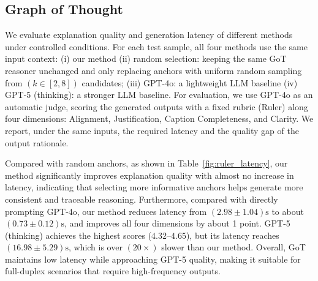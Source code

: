 \subsection{Graph of Thought}
We evaluate explanation quality and generation latency of different methods under controlled conditions. For each test sample, all four methods use the same input context: (i) our method (ii) random selection: keeping the same GoT reasoner unchanged and only replacing anchors with uniform random sampling from $(k\in[2,8])$ candidates; (iii) GPT-4o: a lightweight LLM baseline (iv) GPT-5 (thinking): a stronger LLM baseline. For evaluation, we use GPT-4o as an automatic judge, scoring the generated outputs with a fixed rubric (Ruler) along four dimensions: Alignment, Justification, Caption Completeness, and Clarity. We report, under the same inputs, the required latency and the quality gap of the output rationale.

\begin{table}[t]
\centering
\caption{Reasoning latency and subjective ruler scores across methods.}
\label{fig:ruler_latency}
{\fontsize{7}{7.5}\selectfont
\setlength{\tabcolsep}{6pt}
\renewcommand{\arraystretch}{1.10}
}
\end{table}
Compared with random anchors, as shown in Table~\ref{fig:ruler_latency}, our method significantly improves explanation quality with almost no increase in latency, indicating that selecting more informative anchors helps generate more consistent and traceable reasoning. Furthermore, compared with directly prompting GPT-4o, our method reduces latency from $(2.98\pm1.04)\mathrm{s}$ to about $(0.73\pm0.12)\mathrm{s}$, and improves all four dimensions by about 1 point. GPT-5 (thinking) achieves the highest scores ($4.32$--$4.65$), but its latency reaches $(16.98\pm5.29)\mathrm{s}$, which is over $(20\times)$ slower than our method. Overall, GoT maintains low latency while approaching GPT-5 quality, making it suitable for full-duplex scenarios that require high-frequency outputs.
